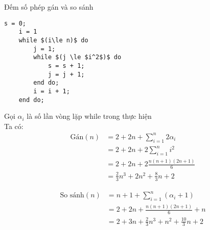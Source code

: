 Đếm số phép gán và so sánh
\begin{lstlisting}[mathescape]
    s = 0;                    
    i = 1                     
    while $(i\le n)$ do          
        j = 1;                 
        while $(j \le $i^2$)$ do 
            s = s + 1;
            j = j + 1;
        end do;
        i = i + 1;              
    end do;
\end{lstlisting}
Gọi $\alpha_i$ là số lần vòng lặp while trong thực hiện\\
Ta có:
\begin{align*}
    \text{Gán} (n) &= 2 + 2n + \sum_{i = 1}^{n}2\alpha_i\\
        &= 2 + 2n + 2\sum_{i = 1}^{n}i^2\\
        &= 2 + 2n + 2\frac{n(n+1)(2n+1)}{6}\\
        &= \frac{2}{3}n^3 + 2n^2 + \frac{8}{3}n + 2
\end{align*}

\begin{align*}
    \text{So sánh} (n) &= n + 1 + \sum_{i = 1}^{n}(\alpha_i + 1)\\
        &= 2 + 2n + \frac{n(n+1)(2n+1)}{6} + n\\  
        &= 2 + 3n + \frac{2}{3}n^3 + n^2 + \frac{10}{3}n + 2\\
\end{align*}
